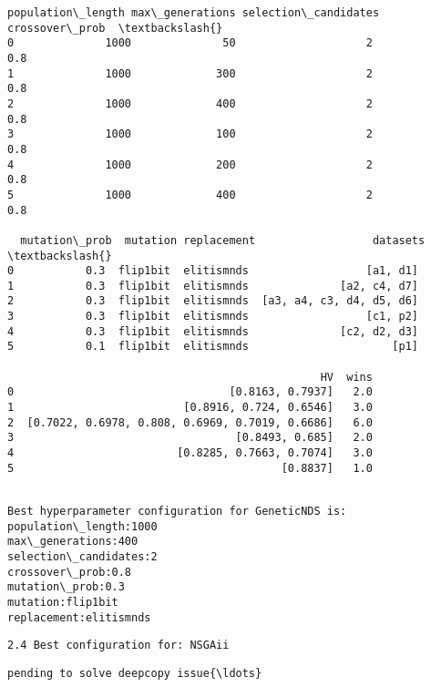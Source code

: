 \documentclass[11pt]{article}
\begin{document}
    
    \begin{Verbatim}[commandchars=\\\{\}]
  population\_length max\_generations selection\_candidates crossover\_prob  \textbackslash{}
0              1000              50                    2            0.8   
1              1000             300                    2            0.8   
2              1000             400                    2            0.8   
3              1000             100                    2            0.8   
4              1000             200                    2            0.8   
5              1000             400                    2            0.8   

  mutation\_prob  mutation replacement                  datasets  \textbackslash{}
0           0.3  flip1bit  elitismnds                  [a1, d1]   
1           0.3  flip1bit  elitismnds              [a2, c4, d7]   
2           0.3  flip1bit  elitismnds  [a3, a4, c3, d4, d5, d6]   
3           0.3  flip1bit  elitismnds                  [c1, p2]   
4           0.3  flip1bit  elitismnds              [c2, d2, d3]   
5           0.1  flip1bit  elitismnds                      [p1]   

                                                HV  wins  
0                                 [0.8163, 0.7937]   2.0  
1                          [0.8916, 0.724, 0.6546]   3.0  
2  [0.7022, 0.6978, 0.808, 0.6969, 0.7019, 0.6686]   6.0  
3                                  [0.8493, 0.685]   2.0  
4                         [0.8285, 0.7663, 0.7074]   3.0  
5                                         [0.8837]   1.0  
    \end{Verbatim}

    
    \begin{Verbatim}[commandchars=\\\{\}]

Best hyperparameter configuration for GeneticNDS is:
population\_length:1000
max\_generations:400
selection\_candidates:2
crossover\_prob:0.8
mutation\_prob:0.3
mutation:flip1bit
replacement:elitismnds
    \end{Verbatim}

    \begin{verbatim}
2.4 Best configuration for: NSGAii
\end{verbatim}

    \begin{Verbatim}[commandchars=\\\{\}]
pending to solve deepcopy issue{\ldots}
    \end{Verbatim}
\end{document}
